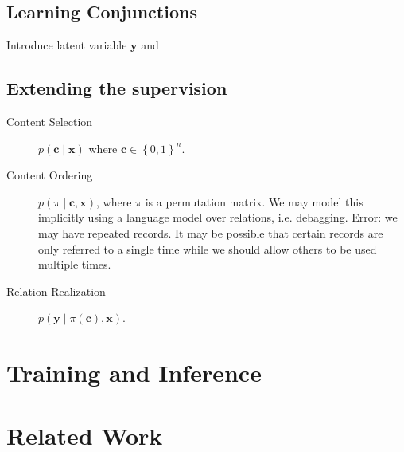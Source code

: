 \documentclass{article}
\newcommand\set[1]{\left\{#1\right\}}
\newcommand{\bc}{\mathbf{c}}
\newcommand{\bx}{\mathbf{x}}
\newcommand{\by}{\mathbf{y}}
\begin{document}
\subsection{Learning Conjunctions}
Introduce latent variable $\by$ and 

\subsection{Extending the supervision}
\begin{description}
\item[Content Selection] $p(\bc\mid\bx)$ where $\bc\in\set{0,1}^n$. 
\item[Content Ordering]
$p(\pi\mid\bc,\bx)$, where $\pi$ is a permutation matrix.
We may model this implicitly using a language model over relations,
i.e. debagging.
Error: we may have repeated records.
It may be possible that certain records are only referred to a single time
while we should allow others to be used multiple times.
\item[Relation Realization] $p(\by\mid\pi(\bc),\bx)$.
\end{description}

\section{Training and Inference}

\section{Related Work}



\end{document}
